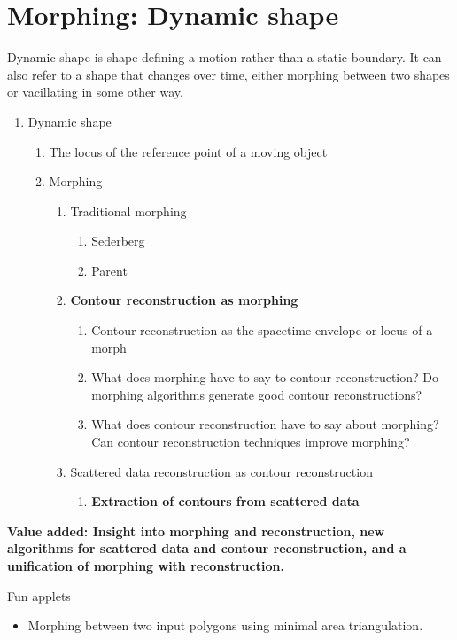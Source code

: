 \documentclass[11pt,titlepage]{article}
\begin{document}
\clearpage

\section{Morphing: Dynamic shape}

Dynamic shape is shape defining a motion rather than a static boundary.
It can also refer to a shape that changes over time, either morphing between two shapes
or vacillating in some other way.

\begin{enumerate}
\item Dynamic shape
\begin{enumerate}
\item The locus of the reference point of a moving object
\item Morphing
\begin{enumerate}
\item Traditional morphing
\begin{enumerate}
\item Sederberg
\item Parent
\end{enumerate}
\item {\bf Contour reconstruction as morphing}
\begin{enumerate}
\item Contour reconstruction as the spacetime envelope or locus of a morph
\item What does morphing have to say to contour reconstruction?
	Do morphing algorithms generate good contour reconstructions?
\item What does contour reconstruction have to say about morphing?
	Can contour reconstruction techniques improve morphing?
\end{enumerate}
\item Scattered data reconstruction as contour reconstruction
\begin{enumerate}
\item {\bf Extraction of contours from scattered data}
\end{enumerate}
\end{enumerate}
\end{enumerate}
\end{enumerate}

{\bf Value added: Insight into morphing and reconstruction, 
new algorithms for scattered data and contour reconstruction,
and a unification of morphing with reconstruction.}

Fun applets
\begin{itemize}
\item Morphing between two input polygons using minimal area triangulation.
\end{itemize}
\end{document}
